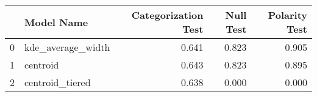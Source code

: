 \documentclass{article}
\begin{document}
\begin{tabular}{llrrr}
\toprule
{} &         Model Name &  Categorization Test &  Null Test &  Polarity Test \\
\midrule
0 &  kde\_average\_width &                0.641 &      0.823 &          0.905 \\
1 &           centroid &                0.643 &      0.823 &          0.895 \\
2 &    centroid\_tiered &                0.638 &      0.000 &          0.000 \\
\bottomrule
\end{tabular}
\end{document}
